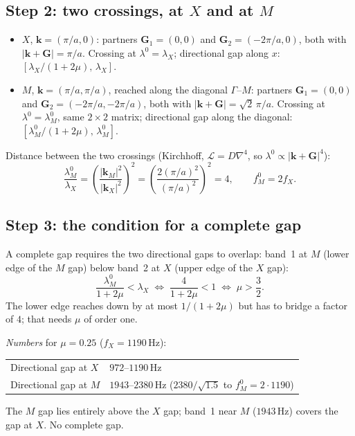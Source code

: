 \subsection{Step 2: two crossings, at $X$ and at $M$}
\begin{itemize}
  \item \textbf{$X$}, $\mathbf{k} = (\pi/a, 0)$: partners
        $\mathbf{G}_1 = (0,0)$ and $\mathbf{G}_2 = (-2\pi/a, 0)$, both with
        $|\mathbf{k}+\mathbf{G}| = \pi/a$. Crossing at $\lambda^0 = \lambda_X$;
        directional gap along $x$: $[\lambda_X/(1+2\mu),\, \lambda_X]$.
  \item \textbf{$M$}, $\mathbf{k} = (\pi/a, \pi/a)$, reached along the
        diagonal $\Gamma$--$M$: partners $\mathbf{G}_1 = (0,0)$ and
        $\mathbf{G}_2 = (-2\pi/a, -2\pi/a)$, both with
        $|\mathbf{k}+\mathbf{G}| = \sqrt{2}\,\pi/a$. Crossing at
        $\lambda^0 = \lambda_M^0$, same $2\times 2$ matrix; directional gap
        along the diagonal: $[\lambda_M^0/(1+2\mu),\, \lambda_M^0]$.
\end{itemize}
Distance between the two crossings (Kirchhoff, $\mathcal{L} = D\nabla^4$, so
$\lambda^0 \propto |\mathbf{k}+\mathbf{G}|^4$):
\begin{equation}
  \frac{\lambda_M^0}{\lambda_X}
  = \left(\frac{|\mathbf{k}_M|^2}{|\mathbf{k}_X|^2}\right)^2
  = \left(\frac{2(\pi/a)^2}{(\pi/a)^2}\right)^2 = 4,
  \qquad f_M^0 = 2 f_X .
\end{equation}

\subsection{Step 3: the condition for a complete gap}
A complete gap requires the two directional gaps to overlap: band~1 at $M$
(lower edge of the $M$ gap) below band~2 at $X$ (upper edge of the $X$ gap):
\begin{equation}
  \frac{\lambda_M^0}{1+2\mu} < \lambda_X
  \;\Longleftrightarrow\; \frac{4}{1+2\mu} < 1
  \;\Longleftrightarrow\; \mu > \frac{3}{2} .
\end{equation}
The lower edge reaches down by at most $1/(1+2\mu)$ but has to bridge a factor
of $4$; that needs $\mu$ of order one.

\emph{Numbers} for $\mu = 0.25$ ($f_X = 1190\,\mathrm{Hz}$):
\begin{center}
\begin{tabular}{|l|l|}
\hline
Directional gap at $X$ & $972$--$1190\,\mathrm{Hz}$ \\
Directional gap at $M$ & $1943$--$2380\,\mathrm{Hz}$ ($2380/\sqrt{1.5}$ to $f_M^0 = 2 \cdot 1190$) \\
\hline
\end{tabular}
\end{center}
The $M$ gap lies entirely above the $X$ gap; band~1 near $M$ ($1943\,\mathrm{Hz}$)
covers the gap at $X$. No complete gap.

